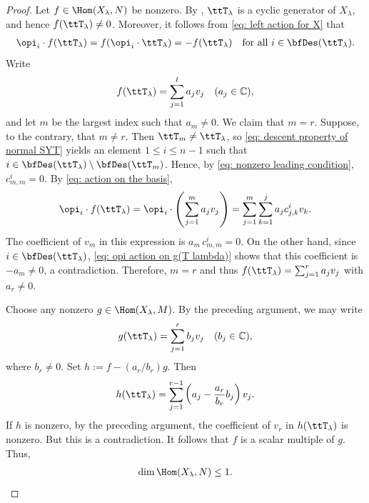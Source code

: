 \documentclass[12pt, reqno]{amsart}
\theoremstyle{plain}
\theoremstyle{definition}
\numberwithin{equation}{section}
\numberwithin{figure}{section}
\numberwithin{table}{section}
\def\C{\mathbb C}
\begin{document}
\begin{proof}
Let $f \in\Hom(X_\lambda,N)$ be nonzero.
By \cite[Lemma 3.11]{19Searles}, $\ttT_\lambda$ is a cyclic generator
of $X_\lambda$, and hence $f(\ttT_\lambda)\neq 0$.
Moreover,  it follows from
\cref{eq: left action for X} that
\begin{align}\label{eq: opi action on g(T lambda)}
\opi_i\cdot f(\ttT_\lambda)
=
f(\opi_i\cdot\ttT_\lambda)
=
-f(\ttT_\lambda)
\quad
\text{for all }i\in\bfDes(\ttT_{\lambda}).
\end{align}
Write
\[
f(\ttT_\lambda)=\sum_{j=1}^l a_jv_j
\quad (a_j\in\C),
\]
and let $m$ be the largest index such that $a_{m} \neq 0$.
We claim that $m=r$.
Suppose, to the contrary, that $m\neq r$.
Then $\ttT_{m}\neq\ttT_\lambda$, so
\cref{eq: descent property of normal SYT} yields an element $1 \leq i \leq n-1$ such that $i\in\bfDes(\ttT_\lambda)\setminus\bfDes(\ttT_{m})$.
Hence, by \cref{eq: nonzero leading condition}, 
 $c^i_{m,m}  = 0$.
By \cref{eq: action on the basis},
\[
\opi_i\cdot f(\ttT_\lambda)
=
\opi_i\cdot\left(\sum_{j=1}^{m}a_jv_j\right)
=
\sum_{j=1}^{m}\sum_{k=1}^j
a_j c^i_{j,k} v_k.
\]
The coefficient of $v_{m}$ in this expression is
$a_{m} \, c^i_{m,m} = 0$.
On the other hand, since
$i\in\bfDes(\ttT_\lambda)$,
\cref{eq: opi action on g(T lambda)} shows that this coefficient is
$-a_{m} \neq 0$, a contradiction.
Therefore, $m = r$ and thus
$f(\ttT_\lambda)
=
\sum_{j=1}^{r}a_jv_j$
with $a_r \neq 0$.

Choose any nonzero $g \in \Hom(X_{\lambda}, M)$. 
By the preceding argument, we may write
\[
g(\ttT_\lambda)
=
\sum_{j=1}^{r}b_jv_j
\quad  (b_j\in\C),
\]
where $b_{r}\neq0$.
Set $h := f- (a_{r} / b_{r})g$.
Then
\[
h(\ttT_\lambda)
=
\sum_{j=1}^{r-1}
\left(
a_j-\frac{a_{r}}{b_{r}}b_j
\right)v_j.
\]
If $h$ is nonzero, by the preceding argument, the
coefficient of $v_{r}$ in $h(\ttT_\lambda)$ is nonzero.
But this is a contradiction.
It follows that $f$ is a scalar multiple of $g$.
Thus,
\begin{align}\label{eq: dim X lam N leq 1}
\dim\Hom(X_\lambda,N)\leq1.
\end{align}


\end{proof}
\end{document}

